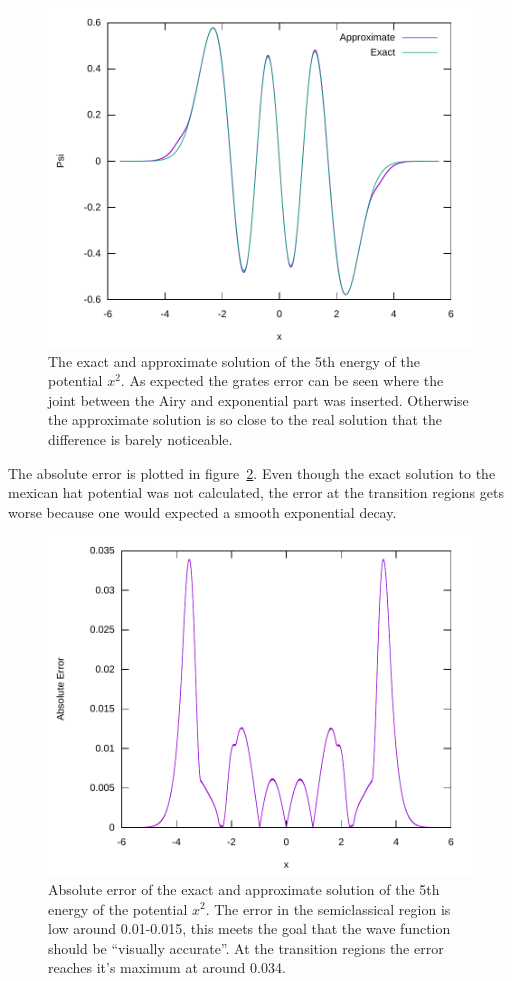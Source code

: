 \documentclass[11pt,DIV=10,final]{scrreprt} %
\begin{document}
\begin{figure}[H]
  \centering
  \includegraphics[width=\textwidth]{plots/approx_vs_exact_wave_square_5.pdf}
  \caption{\label{fig:approx-vs-exact} The exact and approximate solution of the 5th energy of the potential $x^{2}$. As expected the grates error can be seen where the joint between the Airy and
    exponential part was inserted. Otherwise the approximate solution is so close to the real solution that the difference is barely noticeable.}
\end{figure}
The absolute error is plotted in figure~\ref{fig:absolute-error}. Even though the exact solution to the mexican hat potential was not calculated, the error at the transition regions gets worse because
one would expected a smooth exponential decay.
\begin{figure}[H]
  \centering
  \includegraphics[width=\textwidth]{plots/absolute_error_square_5.pdf}
  \caption{\label{fig:absolute-error} Absolute error of the exact and approximate solution of the 5th energy of the potential $x^{2}$. The error in the semiclassical region is low around 0.01-0.015, this
    meets the goal that the wave function should be ``visually accurate''. At the transition regions the error reaches it's maximum at around 0.034.}
\end{figure}
\end{document}
